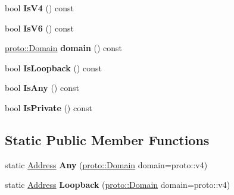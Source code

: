 \begin{DoxyCompactItemize}
\item 
\hypertarget{classlsf_1_1asio_1_1Address_aff769fc5d4c260cc4212ddbec96ed71f}{
bool {\bfseries IsV4} () const }
\label{classlsf_1_1asio_1_1Address_aff769fc5d4c260cc4212ddbec96ed71f}

\item 
\hypertarget{classlsf_1_1asio_1_1Address_acd56517132271be8f2fe410c8dd51844}{
bool {\bfseries IsV6} () const }
\label{classlsf_1_1asio_1_1Address_acd56517132271be8f2fe410c8dd51844}

\item 
\hypertarget{classlsf_1_1asio_1_1Address_a9abdf5203ca61ac2a15b04af250df06a}{
\hyperlink{classlsf_1_1asio_1_1proto_1_1Domain}{proto::Domain} {\bfseries domain} () const }
\label{classlsf_1_1asio_1_1Address_a9abdf5203ca61ac2a15b04af250df06a}

\item 
\hypertarget{classlsf_1_1asio_1_1Address_a4c87f8bb2e8f481436cd92e25e894248}{
bool {\bfseries IsLoopback} () const }
\label{classlsf_1_1asio_1_1Address_a4c87f8bb2e8f481436cd92e25e894248}

\item 
\hypertarget{classlsf_1_1asio_1_1Address_a0623192e3572649283f4f31538e722c5}{
bool {\bfseries IsAny} () const }
\label{classlsf_1_1asio_1_1Address_a0623192e3572649283f4f31538e722c5}

\item 
\hypertarget{classlsf_1_1asio_1_1Address_ac10b8c131f67b8bff62da7b286b4d5fa}{
bool {\bfseries IsPrivate} () const }
\label{classlsf_1_1asio_1_1Address_ac10b8c131f67b8bff62da7b286b4d5fa}

\end{DoxyCompactItemize}
\subsection*{Static Public Member Functions}
\begin{DoxyCompactItemize}
\item 
\hypertarget{classlsf_1_1asio_1_1Address_a9e122cebf24c44728a29053d25f2ae57}{
static \hyperlink{classlsf_1_1asio_1_1Address}{Address} {\bfseries Any} (\hyperlink{classlsf_1_1asio_1_1proto_1_1Domain}{proto::Domain} domain=proto::v4)}
\label{classlsf_1_1asio_1_1Address_a9e122cebf24c44728a29053d25f2ae57}

\item 
\hypertarget{classlsf_1_1asio_1_1Address_aa37243264e0ad8887e3efd39bf346d1a}{
static \hyperlink{classlsf_1_1asio_1_1Address}{Address} {\bfseries Loopback} (\hyperlink{classlsf_1_1asio_1_1proto_1_1Domain}{proto::Domain} domain=proto::v4)}
\label{classlsf_1_1asio_1_1Address_aa37243264e0ad8887e3efd39bf346d1a}

\end{DoxyCompactItemize}
